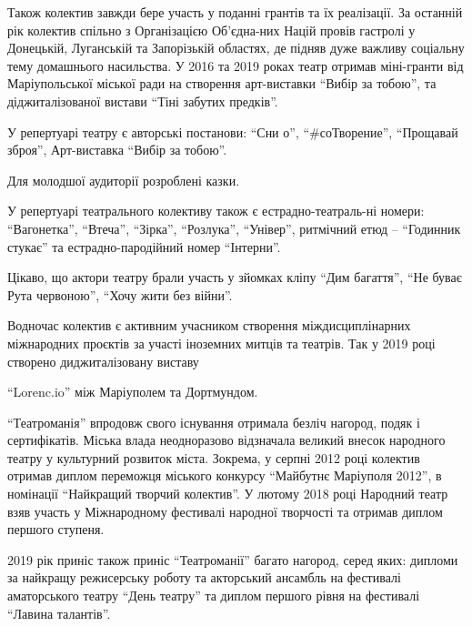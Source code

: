 Також колектив завжди бере участь у поданні грантів та їх реалізації. За
останній рік колектив спільно з Організацією Об'єдна\hyp{}них Націй провів гастролі у
Донецькій, Луганській та Запорізькій  областях, де підняв дуже важливу
соціальну тему домашнього насильства. У 2016 та 2019 роках театр отримав
міні-гранти від Маріупольської міської ради  на створення арт-виставки \enquote{Вибір
за тобою}, та діджиталізованої вистави \enquote{Тіні забутих предків}.

У репертуарі театру є авторські постанови: \enquote{Сни о}, \enquote{\#соТворение},  \enquote{Прощавай
зброя}, Арт-виставка \enquote{Вибір за тобою}.

Для молодшої аудиторії розроблені казки.

У репертуарі театрального колективу також є естрадно-театраль\hyp{}ні номери:
\enquote{Вагонетка}, \enquote{Втеча}, \enquote{Зірка}, \enquote{Розлука}, \enquote{Універ}, ритмічний етюд – \enquote{Годинник
стукає} та естрадно-пародійний номер \enquote{Інтерни}.

Цікаво, що актори театру брали участь у зйомках кліпу \enquote{Дим багаття}, \enquote{Не буває
Рута червоною}, \enquote{Хочу жити без війни}.

Водночас колектив є активним учасником створення міждисциплінарних
міжнародних проєктів за участі іноземних митців та театрів. Так у 2019 році
створено диджиталізовану виставу\par\noindent\enquote{Lorenc.io} між Маріуполем та Дортмундом.

\enquote{Театроманія} впродовж свого існування отримала безліч нагород, подяк і
сертифікатів. Міська влада неодноразово відзначала великий внесок народного
театру у культурний розвиток міста.  Зокрема, у серпні 2012 році колектив
отримав диплом переможця міського конкурсу \enquote{Майбутнє Маріуполя 2012}, в
номінації \enquote{Найкращий творчий колектив}. У лютому 2018 році Народний театр взяв
участь у Міжнародному фестивалі народної творчості та отримав диплом першого
ступеня.

2019 рік приніс також приніс \enquote{Театроманії} багато нагород, серед яких: дипломи
за найкращу режисерську роботу та акторський ансамбль на фестивалі аматорського
театру \enquote{День театру} та диплом першого рівня на фестивалі \enquote{Лавина талантів}.


